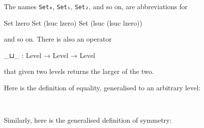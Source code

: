 The names \texttt{Set₀}, \texttt{Set₁}, \texttt{Set₂}, and so on, are
abbreviations for

\begin{myDisplay}
Set lzero
Set (lsuc lzero)
Set (lsuc (lsuc lzero))
\end{myDisplay}

and so on. There is also an operator

\begin{myDisplay}
_⊔_ : Level → Level → Level
\end{myDisplay}

that given two levels returns the larger of the two.

Here is the definition of equality, generalised to an arbitrary level:

\begin{fence}
\begin{code}%
\>[0]\AgdaSpace{}%
\AgdaSpace{}%
\AgdaSymbol{\{}\AgdaSpace{}%
\AgdaSymbol{:}\AgdaSpace{}%
\AgdaSymbol{\}}\AgdaSpace{}%
\AgdaSymbol{\{}\AgdaSpace{}%
\AgdaSymbol{:}\AgdaSpace{}%
\AgdaSpace{}%
\AgdaSymbol{\}}\AgdaSpace{}%
\AgdaSymbol{(}\AgdaSpace{}%
\AgdaSymbol{:}\AgdaSpace{}%
\AgdaSymbol{)}\AgdaSpace{}%
\AgdaSymbol{:}\AgdaSpace{}%
\AgdaSpace{}%
\AgdaSpace{}%
\AgdaSpace{}%
\AgdaSpace{}%
\<%
\\
\>[0][@{}l@{\AgdaIndent{0}}]%
\>[2]\AgdaSpace{}%
\AgdaSymbol{:}\AgdaSpace{}%
\AgdaSpace{}%
\AgdaSpace{}%
\<%
\end{code}
\end{fence}

Similarly, here is the generalised definition of symmetry:

